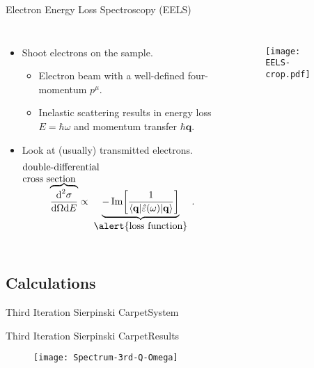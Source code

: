\documentclass{beamer}
\begin{document}
\begin{frame}{Electron Energy Loss Spectroscopy (EELS)}
    \begin{columns}[T]
        \begin{itemize}
        \item Shoot electrons on the sample.
            \begin{itemize}
            \item Electron beam with a well-defined four-momentum $p^{\mu}$.
            \item Inelastic scattering results in \alert{energy loss $E = \hbar\omega$} and \alert{momentum transfer $\hbar\mathbf{q}$}.
            \end{itemize}
        \item Look at (usually) transmitted electrons.
            \[ \overbrace{\frac{\text{d}^2\sigma}{\text{d}\Omega\text{d}E}} ^{\mathclap{\text{\parbox[c]{3cm}{\normalsize double-differential \\ cross section}}}} \propto\; 
               \underbrace{-\operatorname{Im}\! \left[\frac{1}{\langle\mathbf{q}| \hat\varepsilon(\omega) |\mathbf{q}\rangle}\right]} _\text{\normalsize \alert{loss function}} \;.
            \] %
        \end{itemize}
        \vspace{-0.3cm}
        \begin{figure}
        \texttt{[image: EELS-crop.pdf]}
        \end{figure}
    \end{columns}
\end{frame}

\subsection{Calculations}

\begin{frame}{Third Iteration Sierpinski Carpet}{System}
    \begin{figure}
    \vspace{-.5cm}
    
    \end{figure}
\end{frame}

\begin{frame}{Third Iteration Sierpinski Carpet}{Results}
    \begin{figure}
    \texttt{[image: Spectrum-3rd-Q-Omega]}
    \end{figure}
\end{frame}
\end{document}
